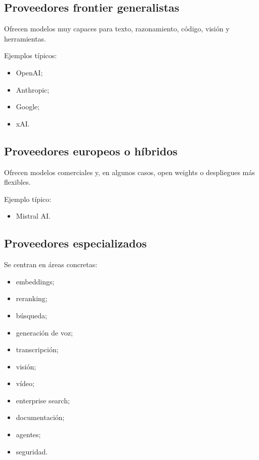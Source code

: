 \subsection{Proveedores frontier
generalistas}\label{proveedores-frontier-generalistas}

Ofrecen modelos muy capaces para texto, razonamiento, código, visión y
herramientas.

Ejemplos típicos:

\begin{itemize}
\tightlist
\item
  OpenAI;
\item
  Anthropic;
\item
  Google;
\item
  xAI.
\end{itemize}

\subsection{Proveedores europeos o
híbridos}\label{proveedores-europeos-o-huxedbridos}

Ofrecen modelos comerciales y, en algunos casos, open weights o
despliegues más flexibles.

Ejemplo típico:

\begin{itemize}
\tightlist
\item
  Mistral AI.
\end{itemize}

\subsection{Proveedores
especializados}\label{proveedores-especializados}

Se centran en áreas concretas:

\begin{itemize}
\tightlist
\item
  embeddings;
\item
  reranking;
\item
  búsqueda;
\item
  generación de voz;
\item
  transcripción;
\item
  visión;
\item
  vídeo;
\item
  enterprise search;
\item
  documentación;
\item
  agentes;
\item
  seguridad.
\end{itemize}

